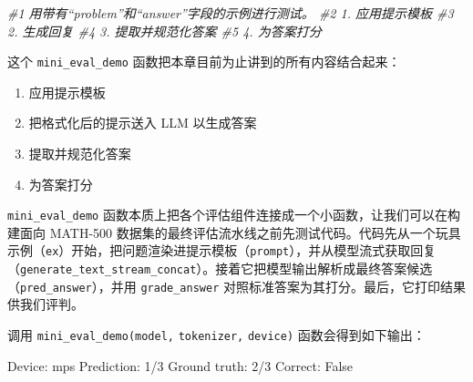 {\noindent\small\textit{\#1 用带有“problem”和“answer”字段的示例进行测试。 \newline \#2 1. 应用提示模板 \newline \#3 2. 生成回复 \newline \#4 3. 提取并规范化答案 \newline \#5 4. 为答案打分}\par}

这个 \texttt{mini\_eval\_demo} 函数把本章目前为止讲到的所有内容结合起来：

\begin{enumerate}
\item 应用提示模板
\item 把格式化后的提示送入 LLM 以生成答案
\item 提取并规范化答案
\item 为答案打分
\end{enumerate}

\texttt{mini\_eval\_demo} 函数本质上把各个评估组件连接成一个小函数，让我们可以在构建面向 MATH-500 数据集的最终评估流水线之前先测试代码。代码先从一个玩具示例（\texttt{ex}）开始，把问题渲染进提示模板（\texttt{prompt}），并从模型流式获取回复（\texttt{generate\_text\_stream\_concat}）。接着它把模型输出解析成最终答案候选（\texttt{pred\_answer}），并用 \texttt{grade\_answer} 对照标准答案为其打分。最后，它打印结果供我们评判。

调用 \texttt{mini\_eval\_demo(model,} \texttt{tokenizer,} \texttt{device)} 函数会得到如下输出：

\begin{codebox}
Device: mps
Prediction: 1/3
Ground truth: 2/3
Correct: False
\end{codebox}

